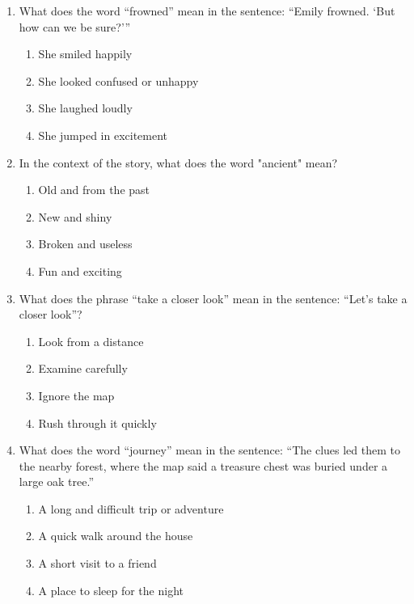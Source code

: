 \documentclass[12pt]{article}
\begin{document}
\begin{enumerate}

    \item What does the word “frowned” mean in the sentence: “Emily frowned. ‘But how can we be sure?’” 
    \begin{enumerate}[label=\Alph*.]
        \item She smiled happily
        \item She looked confused or unhappy
        \item She laughed loudly
        \item She jumped in excitement
    \end{enumerate}
    \vspace{0.5cm}

    \item In the context of the story, what does the word "ancient" mean?
    \begin{enumerate}[label=\Alph*.]
        \item Old and from the past
        \item New and shiny
        \item Broken and useless
        \item Fun and exciting
    \end{enumerate}
    \vspace{0.5cm}

    \item What does the phrase “take a closer look” mean in the sentence: “Let’s take a closer look”?
    \begin{enumerate}[label=\Alph*.]
        \item Look from a distance
        \item Examine carefully
        \item Ignore the map
        \item Rush through it quickly
    \end{enumerate}
    \vspace{0.5cm}

    \item What does the word “journey” mean in the sentence: “The clues led them to the nearby forest, where the map said a treasure chest was buried under a large oak tree.” 
    \begin{enumerate}[label=\Alph*.]
        \item A long and difficult trip or adventure
        \item A quick walk around the house
        \item A short visit to a friend
        \item A place to sleep for the night
    \end{enumerate}
    \vspace{0.5cm}


\end{enumerate}
\end{document}

